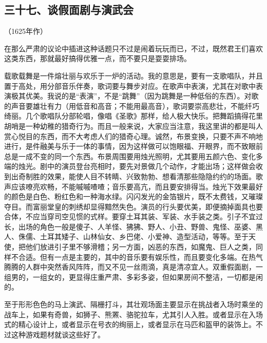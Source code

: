 \subsection*{三十七、谈假面剧与演武会}
\begin{center}
    （1625年作）
\end{center}
\par 在那么严肃的议论中插进这种话题只不过是闹着玩玩而已，不过，既然君王们喜欢这类东西，那就最好搞得优雅一点，而不要只是耍耍排场。
\par 载歌载舞是一件熔壮丽与欢乐于一炉的活动。我的意思是，要有一支歌唱队，并且置于高处，用分部音乐伴奏，歌词要与舞步对应。在歌声中表演，尤其在对歌中表演极其优美。我说的是“表演”，不是“跳舞”（因为跳舞是一种低俗的东西）。对歌的声音要雄壮有力（用低音和高音；不能用最高音），歌词要崇高悲壮，不能纤巧绮丽。几个歌唱队分部轮唱，像唱《圣歌》那样，给人极大快乐。把舞蹈搞得花里胡哨是一种幼稚的猎奇行为。而且一般来说，大家应当注意，我这里讲的都是叫人赏心悦目的东西，而不大考虑人们的猎奇心理。诚然，布景变换，只要不声不响地进行，是件融美与乐于一体的事情，因为这样做可以饱眼福、开眼界，而不致眼前总是一成不变的同一个东西。布景周围要用烛光照明，尤其要用五颜六色、变化多端的烛光。剧中的演员登台亮相时，要先对景做几个动作，才能出场；这样做会收到出奇制胜的效果，能使人目不转睛、兴致勃勃、想看清那些隐隐约约的场面。歌声应该嘹亮欢畅，不能嘁嘁喳喳；音乐要高亢，而且要安排得当。烛光下效果最好的颜色是白色、粉红色和一种海水绿。闪闪发光的金箔银片，既不太费钱，又璀璨夺目。而富丽堂皇的刺绣却显得黯然失色。演员的行头要优美，即便摘掉面具也要合体，不应当穿司空见惯的式样。要穿土耳其装、军装、水手装之类。引子不宜过长，出场的角色一般是傻子、人羊怪、狒狒、野人、小丑、野兽、鬼怪、巫婆、黑人、侏儒、土耳其矮子、山林仙女、乡巴佬、小爱神、造型活动，等等。至于天使，把他们放进引子里不够滑稽；另一方面，凶恶的东西，如魔鬼、巨人之类，同样不合适。但有一点是主要的，其中的音乐要有娱乐性，而且要变化多端。在热气腾腾的人群中突然香风阵阵，而又不见一丝雨滴，真是清凉宜人。双重假面剧，一组男的，一组女的，更显得庄重严肃、多彩多姿，但如果房间不整洁，一切都是闲的。
\par 至于形形色色的马上演武、隔栅打斗，其壮观场面主要显示在挑战者入场时乘坐的战车上，如果有奇兽，如狮子、熊罴、骆驼拉车，尤其引人入胜。或者显示在入场式的精心设计上，或者显示在号衣的绚丽上，或者显示在马匹和盔甲的装饰上。不过这种游戏题材就谈这些好了。




